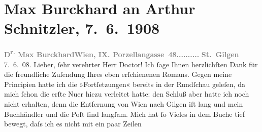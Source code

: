 

         
         \renewcommand{\erwaehntePersonen}{Personen: Olga Schnitzler}
         \renewcommand{\erwaehnteOrte}{Orte: Porzellangasse, St. Gilgen, Wien}
         \renewcommand{\erwaehnteWerke}{Werke: Der Weg ins Freie. Roman, Die neue Rundschau}
               \section[Max Burckhard an Arthur Schnitzler, 7. 6. 1908]{ Max Burckhard an Arthur Schnitzler, 7. 6. 1908}\nopagebreak{}\rehead{ }\begin{ledgroupsized}[t]{13cm}\normalsize\beginnumbering \toendnotes[C]{\smallbreak\pagebreak[2]} 
\toendnotes[C]{\smallbreak}\pstart
           \noindent{}{\pb}\textcolor{gray}{\textbf{D\textsuperscript{r.} Max Burckhard}}\hfill \textcolor{gray}{\textbf{Wien, IX. Porzellangasse 48..........}}\pend
           \pstart
           \raggedleft{}\textcolor{gray}{\textbf{St. Gilgen}}{ }7. 6. 08.\pend
           \pstart{}Lieber, ſehr verehrter Herr Doctor!\pend\pstart
           Ich ſage Ihnen herzlichſten Dank für die freundliche Zuſendung Ihres eben
               erſchienenen Romans. Gegen
               meine Principien hatte ich die »Fortſetzungen« bereits in der Rundſchau geleſen, da mich ſchon die erſte Nu{\geminationm}er hiezu verleitet hatte: den Schluß aber hatte ich
               noch nicht erhalten, denn die Entfernung von Wien
               nach Gilgen iſt lang und mein Buchhändler und die
               Poſt ſind langſam. Mich hat ſo Vieles in dem Buche tief bewegt, daſs ich es nicht mit ein paar Zeilen

\end{ledgroupsized}
